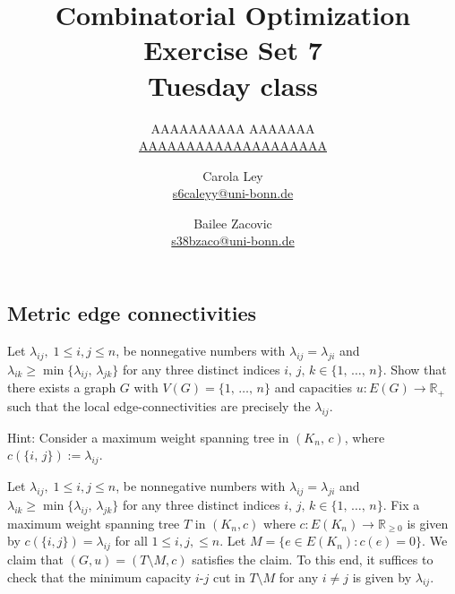 \documentclass{article}
\title{Combinatorial Optimization \\ Exercise Set 7 \\ Tuesday class}
\author{
  AAAAAAAAAA AAAAAAA \\
  \href{mailto:AAAAAAAAAAAAAAAAAAAA}{AAAAAAAAAAAAAAAAAAAA}
  \and
  Carola Ley \\
  \href{mailto:s6caleyy@uni-bonn.de}{s6caleyy@uni-bonn.de}
  \and
  Bailee Zacovic \\
  \href{mailto:s38bzaco@uni-bonn.de}{s38bzaco@uni-bonn.de}
}
\newcommand{\R}{\mathbb{R}}
\begin{document}
  \maketitle

  \setcounter{section}{7}
  \subsection{Metric edge connectivities}
  \begin{centerframebox}
    Let $\lambda_{ij},\; 1 \leq i, j \leq n$, be nonnegative numbers with $\lambda_{ij} = \lambda_{ji}$ and
    $\lambda_{ik} \geq \min\{\lambda_{ij},\, \lambda_{jk}\}$ for any three distinct indices $i,\, j,\, k \in \{1,\, \dots,\, n\}$.
    Show that there exists a graph $G$ with $V(G) = \{1,\, \dots,\, n\}$ and capacities $u: E(G) \to \R_+$ such
    that the local edge-connectivities are precisely the $\lambda_{ij}$.

    Hint: Consider a maximum weight spanning tree in $(K_n,\, c)$, where $c(\{i,\, j\}) := \lambda_{ij}$.
  \end{centerframebox}
  Let $\lambda_{ij},\; 1 \leq i, j \leq n$, be nonnegative numbers with $\lambda_{ij} = \lambda_{ji}$ and $\lambda_{ik} \geq \min\{\lambda_{ij},\, \lambda_{jk}\}$ for any three distinct indices $i,\, j,\, k \in \{1,\, \dots,\, n\}$. Fix a maximum weight spanning tree $T$ in $(K_n,c)$ where $c:E(K_n)\rightarrow \mathbb{R}_{\geq 0}$ is given by $c(\{i,j\})=\lambda_{ij}$ for all $1\leq i,j,\leq n.$ Let $M=\{e\in E(K_n):c(e)=0\}.$ We claim that $(G,u)=(T\setminus M,c)$ satisfies the claim. To this end, it suffices to check that the minimum capacity $i$-$j$ cut in $T\setminus M$ for any $i\neq j$ is given by $\lambda_{ij}.$
\end{document}
